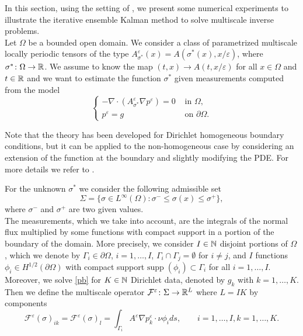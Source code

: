 \documentclass[10pt]{article}
\begin{document}
In this section, using the setting of \cite{AbD18}, we present some numerical experiments to illustrate the iterative ensemble Kalman method to solve multiscale inverse problems. \\
Let $\Omega$ be a bounded open domain. We consider a class of parametrized multiscale locally periodic tensors of the type $A^{\varepsilon}_{\sigma^*}(x) = A(\sigma^*(x),x/\varepsilon)$, where $\sigma^* \colon \Omega \to \mathbb{R}$. We assume to know the map $(t,x) \to A(t,x/\varepsilon)$ for all $x \in \Omega$ and $t \in \mathbb{R}$ and we want to estimate the function $\sigma^*$ given measurements computed from the model
\begin{equation}
\label{pb}
\begin{cases}
- \nabla \cdot ( A^{\varepsilon}_{\sigma^*} \nabla p^{\varepsilon} ) = 0 & \text{ in } \Omega, \\
p^{\varepsilon} = g & \text{ on } \partial \Omega.
\end{cases}
\end{equation}
\begin{remark}
Note that the theory has been developed for Dirichlet homogeneous boundary conditions, but it can be applied to the non-homogeneous case by considering an extension of the function at the boundary and slightly modifying the PDE. For more details we refer to \cite[Remark 8.10]{Sal16}.
\end{remark}
For the unknown $\sigma^*$ we consider the following admissible set
\[ \Sigma = \{ \sigma \in L^{\infty}(\Omega) \colon \sigma^- \le \sigma(x) \le \sigma^+ \}, \]
where $\sigma^-$ and $\sigma^+$ are two given values. \\
The measurements, which we take into account, are the integrals of the normal flux multiplied by some functions with compact support in a portion of the boundary of the domain. More precisely, we consider $I \in \mathbb{N}$ disjoint portions of $\Omega$, which we denote by $\Gamma_i \in \partial \Omega$, $i = 1, \dots, I$, $\Gamma_i \cap \Gamma_j = \emptyset$ for $i \neq j$, and $I$ functions $\phi_i \in H^{1/2}(\partial \Omega)$ with compact support $\mathrm{supp} \; (\phi_i) \subset \Gamma_i$ for all $i = 1, \dots, I$. Moreover, we solve \eqref{pb} for $K \in \mathbb{N}$ Dirichlet data, denoted by $g_k$ with $k = 1, \dots, K$. Then we define the multiscale operator $\mathcal{F}^{\varepsilon} \colon \Sigma \to \mathbb{R}^L$ where $L = IK$ by components
\begin{equation}
\label{boundary_integral_e}
\mathcal{F}^{\varepsilon}(\sigma)_{ik} = \mathcal{F}^{\varepsilon}(\sigma)_{l} = \int_{\Gamma_i} A^{\varepsilon} \nabla p_k^{\varepsilon} \cdot \nu \phi_i ds, \qquad i = 1, \dots, I, k = 1, \dots, K.
\end{equation}
\end{document}
